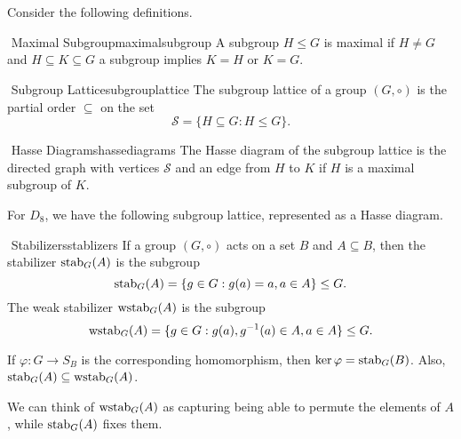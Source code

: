         \vphantom
        \\
        \\
        Consider the following definitions.
        \begin{definition}{\Stop\,\,Maximal Subgroup}{maximalsubgroup}
            A subgroup \(H\leq G\) is maximal if \(H\neq G\) and \(H\subseteq K\subseteq G\) a subgroup implies \(K=H\) or \(K=G\).
        \end{definition}
        \begin{definition}{\Stop\,\,Subgroup Lattice}{subgrouplattice}
            The subgroup lattice of a group \((G,\circ)\) is the partial order \(\subseteq\) on the set
            \begin{equation*}
                \mathcal{S}=\{H\subseteq G:H\leq G\}.
            \end{equation*}
        \end{definition}
        \begin{definition}{\Stop\,\,Hasse Diagrams}{hassediagrams}
            The Hasse diagram of the subgroup lattice is the directed graph with vertices \(\mathcal{S}\) and an edge from \(H\) to \(K\) if \(H\) is a maximal subgroup of \(K\).
        \end{definition}
        \begin{example}
            For \(D_8\), we have the following subgroup lattice, represented as a Hasse diagram.
            \DOTHISLATER
        \end{example}
        \begin{definition}{\Stop\,\,Stabilizers}{stablizers}
            If a group \((G,\circ)\) acts on a set \(B\) and \(A\subseteq B\), then the stabilizer \(\operatorname{stab}_G(A)\) is the subgroup
            \begin{equation*}
                \operatorname{stab}_G(A)=\{g\in G:g(a)=a,a\in A\}\leq G.
            \end{equation*}
            The weak stabilizer \(\operatorname{wstab}_G(A)\) is the subgroup
            \begin{equation*}
                \operatorname{wstab}_G(A)=\{g\in G:g(a),g^{-1}(a)\in A,a\in A\}\leq G.
            \end{equation*}
        \end{definition}
        \begin{remark*}
            If \(\varphi:G\to S_B\) is the corresponding homomorphism, then \(\ker\varphi=\operatorname{stab}_G(B)\). Also, \(\operatorname{stab}_G(A)\subseteq\operatorname{wstab}_G(A)\).
        \end{remark*}
        \begin{remark*}
            We can think of \(\operatorname{wstab}_G(A)\) as capturing being able to permute the elements of \(A\), while \(\operatorname{stab}_G(A)\) fixes them.
        \end{remark*}
